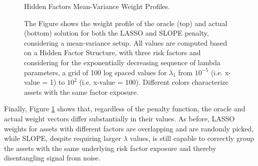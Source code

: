 \documentclass[12pt, a4paper]{article}
\begin{document}
%
\begin{figure}[h!]
\centering
\caption{Hidden Factors Mean-Variance Weight Profiles.}\label{Weights_HiddenFactors_MeanVar}
\captionsetup{font=scriptsize,labelfont=scriptsize, width=\textwidth}
     \caption*{The Figure shows the weight profile of the oracle (top) and actual (bottom) solution for both the LASSO and SLOPE penalty, considering a mean-variance setup. All values are computed based on a Hidden Factor Structure, with three risk factors and considering for the exponentially decreasing sequence of lambda parameters, a grid of 100 log spaced values for $\lambda_{1}$ from $10^{-5}$ (i.e. x-value = 1) to $10^{2}$ (i.e. x-value = 100). Different colors characterize assets with the same factor exposure.}
\end{figure}
%
Finally, Figure \ref{Weights_HiddenFactors_MeanVar} shows that, regardless of the penalty function, the oracle and actual weight vectors differ substantially in their values. As before, LASSO weights for assets with different factors are overlapping and are randomly picked, while SLOPE, despite requiring larger $\lambda$ values, is still capable to correctly group the assets with the same underlying risk factor exposure and thereby disentangling signal from noise.\\

\noindent
\end{document}
